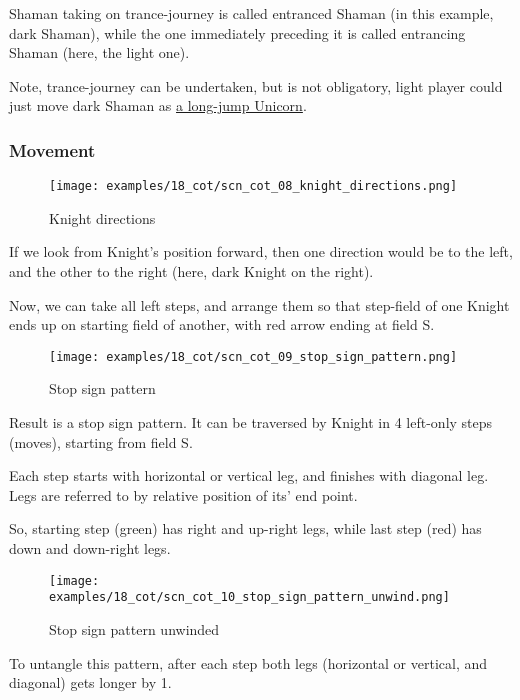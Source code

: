 Shaman taking on trance-journey is called entranced Shaman (in this example, dark Shaman),
while the one immediately preceding it is called entrancing Shaman (here, the light one).

Note, trance-journey can be undertaken, but is not obligatory, light player could just
move dark Shaman as \hyperref[fig:scn_cot_04_dark_shaman_step_ply]{a long-jump Unicorn}.

\subsubsection*{Movement}

\noindent
\begin{wrapfigure}{l}{0.4\textwidth} %
\centering
\texttt{[image: examples/18\_cot/scn\_cot\_08\_knight\_directions.png]}
\caption{Knight directions}
\label{fig:scn_cot_08_knight_directions}
\end{wrapfigure}
If we look from Knight's position forward, then one direction would be to the left, and
the other to the right (here, dark Knight on the right).

Now, we can take all left steps, and arrange them so that step-field of one Knight ends up
on starting field of another, with red arrow ending at field S.

\clearpage %

\noindent
\begin{wrapfigure}[12]{l}{0.4\textwidth} %
\centering
\texttt{[image: examples/18\_cot/scn\_cot\_09\_stop\_sign\_pattern.png]}
\caption{Stop sign pattern}
\label{fig:scn_cot_09_stop_sign_pattern}
\end{wrapfigure}
Result is a stop sign pattern. It can be traversed by Knight in 4 left-only steps (moves),
starting from field S.

Each step starts with horizontal or vertical leg, and finishes with diagonal leg. Legs are
referred to by relative position of its' end point.

So, starting step (green) has right and up-right legs, while last step (red) has down and
down-right legs.

\vspace*{0.05\textheight}
\noindent
\begin{wrapfigure}{l}{0.4\textwidth} %
\centering
\texttt{[image: examples/18\_cot/scn\_cot\_10\_stop\_sign\_pattern\_unwind.png]}
\caption{Stop sign pattern unwinded}
\label{fig:scn_cot_10_stop_sign_pattern_unwind}
\end{wrapfigure}
To untangle this pattern, after each step both legs (horizontal or vertical, and diagonal)
gets longer by 1.


